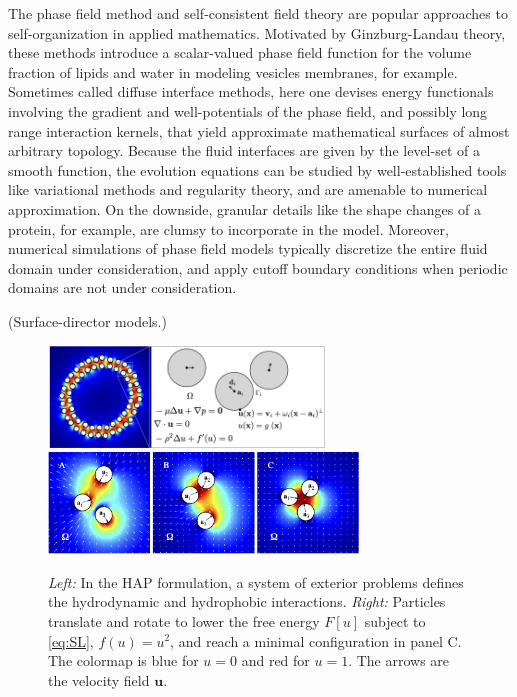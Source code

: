 The phase field method and self-consistent field theory are popular  
approaches to self-organization in applied mathematics.
Motivated by Ginzburg-Landau theory, these methods introduce a scalar-valued
phase field function for the volume fraction of
lipids and water in modeling vesicles membranes, for example. 
Sometimes called diffuse interface methods, here one devises energy functionals
involving the gradient and well-potentials of the phase field, and possibly
long range interaction kernels, that yield approximate mathematical surfaces
of almost arbitrary topology.
Because the fluid interfaces are given by the level-set
of a smooth function, the evolution equations
can be studied by well-established tools like variational methods
and regularity theory, and are amenable to numerical approximation.
On the downside, granular details like the shape changes of a protein, for
example, are clumsy to incorporate in the model.  Moreover, numerical
simulations of phase field models typically discretize the entire fluid
domain under consideration, and apply cutoff boundary conditions
when periodic domains are not under consideration. 

(Surface-director models.)

\begin{figure}
  \begin{center}
    \includegraphics[keepaspectratio,height=2.7cm]{figures/SpecificAim1/Domain.jpg}
    \includegraphics[keepaspectratio,height=2.7cm]{figures/SpecificAim1/3Particles.jpg}
  \end{center}
  \caption{\label{fig:flow_map} \footnotesize {\em Left:} In the HAP
  formulation, a system of exterior problems defines the hydrodynamic
  and hydrophobic interactions. {\em Right:} Particles translate and
  rotate to lower the free energy $F[u]$ subject to \eqref{eq:SL}, $f(u)
  = u^2$, and reach a minimal configuration in panel C. The colormap is
  blue for $u = 0$ and red for $u = 1$. The arrows are the velocity
  field $\mathbf{u}$.}
\end{figure}


